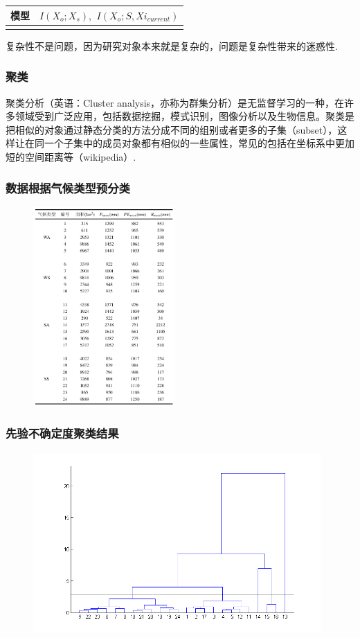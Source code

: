 \documentclass{beamer}
\begin{document}
\begin{CJK}{UTF8}{gkai}
\begin{frame}
\begin{table}[H]
\begin{tabular}{cc}
\\
模型  & $I(X_o;X_s),$ $I(X_o;S,Xi_{current})$  \\
\bottomrule[1.5 pt]\\
\end{tabular}
\end{table}
复杂性不是问题，因为研究对象本来就是复杂的，问题是复杂性带来的迷惑性.
\end{frame}

\begin{frame}
\frametitle{聚类}
聚类分析（英语：Cluster analysis，亦称为群集分析）是无监督学习的一种，在许多领域受到广泛应用，包括数据挖掘，模式识别，图像分析以及生物信息。聚类是把相似的对象通过静态分类的方法分成不同的组别或者更多的子集（subset），这样让在同一个子集中的成员对象都有相似的一些属性，常见的包括在坐标系中更加短的空间距离等（wikipedia）.
\end{frame}
 
\begin{frame}
\frametitle{数据根据气候类型预分类}
 \begin{figure}
\centering
\includegraphics[width=5.4cm]{data.png}
\end{figure}
\end{frame}


\begin{frame}
\frametitle{先验不确定度聚类结果}
\begin{figure}
\centering
\includegraphics[width=11cm]{unzscore.png}
 

\end{figure}
\end{frame}
\end{CJK}
\end{document}
